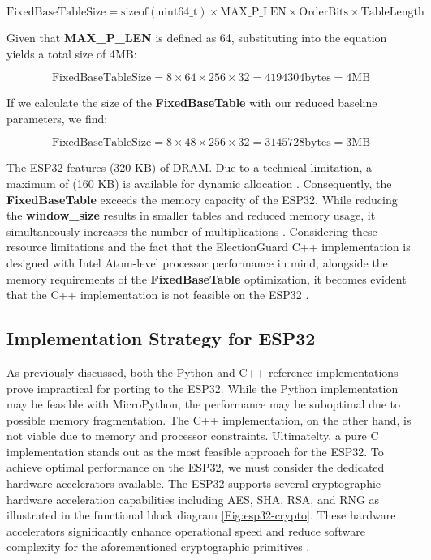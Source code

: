 \begin{equation}
    \mathrm{FixedBaseTable Size} = \mathrm{sizeof(uint64\_t)} \times \mathrm{MAX\_P\_LEN} \times \mathrm{OrderBits} \times \mathrm{TableLength}
\end{equation}

Given that \textbf{MAX\_P\_LEN} is defined as 64, substituting into the equation yields a total size of 4MB:

\begin{equation}
    \mathrm{FixedBaseTable Size} = 8 \times 64 \times 256 \times 32 = 4194304 \mathrm{ bytes} = 4 \mathrm{ MB}
\end{equation}

If we calculate the size of the \textbf{FixedBaseTable} with our reduced baseline parameters, we find:

\begin{equation}
    \mathrm{FixedBaseTable Size} = 8 \times 48 \times 256 \times 32 =  3145728 \mathrm{ bytes} = 3 \mathrm{ MB}
\end{equation}

The ESP32 features (320 KB) of DRAM. Due to a technical limitation, a maximum of (160 KB) is available for dynamic allocation \cite{esp32-ref}. Consequently, the \textbf{FixedBaseTable} exceeds the memory capacity of the ESP32. While reducing the \textbf{window\_size} results in smaller tables and reduced memory usage, it simultaneously increases the number of multiplications \cite[22]{eg-spec}. Considering these resource limitations and the fact that the ElectionGuard C++ implementation is designed with Intel Atom-level processor performance in mind, alongside the memory requirements of the \textbf{FixedBaseTable} optimization, it becomes evident that the C++ implementation is not feasible on the ESP32 \cite{eg-docs}.

\subsection{Implementation Strategy for ESP32}
As previously discussed, both the Python and C++ reference implementations prove impractical for porting to the ESP32. While the Python implementation may be feasible with MicroPython, the performance may be suboptimal due to possible memory fragmentation. The C++ implementation, on the other hand, is not viable due to memory and processor constraints. Ultimatelty, a pure C implementation stands out as the most feasible approach for the ESP32. To achieve optimal performance on the ESP32, we must consider the dedicated hardware accelerators available. The ESP32 supports several cryptographic hardware acceleration capabilities including AES, SHA, RSA, and RNG as illustrated in the functional block diagram \ref{Fig:esp32-crypto}. These hardware accelerators significantly enhance operational speed and reduce software complexity for the aforementioned cryptographic primitives \cite[32]{esp32-series}. 

